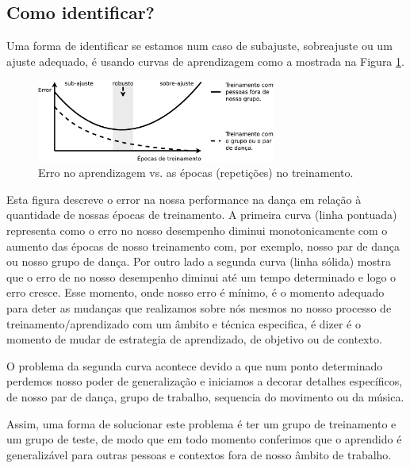 \subsection{Como identificar?}
Uma forma de identificar se estamos num caso de subajuste, sobreajuste ou um ajuste adequado,
é usando curvas de aprendizagem como a mostrada na Figura \ref{fig:fitting:curve}.
\begin{figure}[!h]
  \centering
    \includegraphics[width=0.7\textwidth]{chapters/cap-learning/fitting-error.eps} 
  \caption{Erro no aprendizagem vs. as épocas (repetições) no treinamento.}
\label{fig:fitting:curve}
\end{figure}
Esta figura descreve o error na nossa performance na dança
em relação à quantidade de nossas épocas de treinamento.
A primeira curva (linha pontuada) representa como o erro no nosso desempenho diminui
monotonicamente com o aumento das épocas de nosso treinamento com, por exemplo, nosso par de dança ou
nosso grupo de dança.
Por outro lado a segunda curva (linha sólida) mostra que o erro de no nosso desempenho
diminui até um tempo determinado e logo o erro cresce.
Esse momento, onde nosso erro é mínimo, é o momento adequado para deter 
as mudanças que realizamos sobre nós mesmos no nosso processo de treinamento/aprendizado 
com um âmbito e técnica especifica, é dizer é o momento de mudar de estrategia de aprendizado, de objetivo ou de contexto.  

O problema da segunda curva acontece devido a que num ponto determinado perdemos 
nosso poder de generalização e iniciamos a decorar detalhes específicos, de nosso 
par de dança, grupo de trabalho, sequencia do movimento ou da música.

Assim, uma forma de solucionar este problema é ter um grupo de treinamento e 
um grupo de teste, de modo que em todo momento conferimos que o aprendido 
é generalizável para outras pessoas e contextos fora de nosso âmbito de trabalho.


